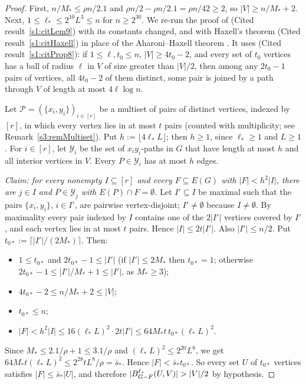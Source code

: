 \begin{proof}
First, $n/M_*\le\rho n/2.1$ and
$\rho n/2-\rho n/2.1=\rho n/42\ge2$, so $|V|\ge n/M_*+2$. Next,
$1\le\ell_*\le2^{10}L^3\le n$ for $n\ge2^{30}$. We re-run the proof of
\cite[Lemma~9]{BM} (Cited result~\ref{s1:citLem9}) with its constants changed,
and with Haxell's theorem (Cited result~\ref{s1:citHaxell}) in place of the
Aharoni--Haxell theorem \cite[Theorem~6]{BM}.
It uses \cite[Proposition~8]{BM} (Cited result~\ref{s1:citProp8}): if
$1\le\ell,t_0\le n$, $|V|\ge4t_0-2$, and every set of $t_0$ vertices has
a ball of radius $\ell$ in $V$ of size greater than $|V|/2$, then among
any $2t_0-1$ pairs of vertices, all $4t_0-2$ of them distinct, some pair
is joined by a path through $V$ of length at most $4\ell\log n$.

Let $\mathcal P=(\{x_i,y_i\})_{i\in[r]}$ be a multiset of pairs of
distinct vertices, indexed by $[r]$, in which every vertex lies in at
most $t$ pairs (counted with multiplicity; see
Remark~\ref{s3:remMultiset}). Put $h:=\lfloor4\ell_*L\rfloor$; then
$h\ge1$, since $\ell_*\ge1$ and $L\ge1$. For $i\in[r]$, let $\mathcal Y_i$
be the set of $x_iy_i$-paths in $G$ that have length at most $h$ and all
interior vertices in $V$. Every $P\in\mathcal Y_i$ has at most $h$ edges.

\emph{Claim: for every nonempty $I\subseteq[r]$ and every $F\subseteq E(G)$
with $|F|<h^2|I|$, there are $j\in I$ and $P\in\mathcal Y_j$ with
$E(P)\cap F=\emptyset$.}
Let $I'\subseteq I$ be maximal such that the pairs $\{x_i,y_i\}$,
$i\in I'$, are pairwise vertex-disjoint; $I'\ne\emptyset$ because
$I\ne\emptyset$. By maximality every pair
indexed by $I$ contains one of the $2|I'|$ vertices covered by $I'$, and
each vertex lies in at most $t$ pairs. Hence $|I|\le2t|I'|$. Also
$|I'|\le n/2$. Put $t_{0*}:=\lceil|I'|/(2M_*)\rceil$. Then:
\begin{itemize}
\item $1\le t_{0*}$ and $2t_{0*}-1\le|I'|$ (if $|I'|\le2M_*$ then
  $t_{0*}=1$; otherwise $2t_{0*}-1\le|I'|/M_*+1\le|I'|$, as $M_*\ge3$);
\item $4t_{0*}-2\le n/M_*+2\le|V|$;
\item $t_{0*}\le n$;
\item $|F|<h^2|I|\le16(\ell_*L)^2\cdot2t|I'|\le64M_*t\,t_{0*}(\ell_*L)^2$.
\end{itemize}
Since $M_*\le2.1/\rho+1\le3.1/\rho$ and $(\ell_*L)^2\le2^{20}L^8$, we get
$64M_*t(\ell_*L)^2\le2^{28}tL^8/\rho=\bar s_*$. Hence $|F|<\bar s_*t_{0*}$.
So every set $U$ of $t_{0*}$ vertices satisfies $|F|\le\bar s_*|U|$, and
therefore $|\Ball{\ell_*}{G-F}{U,V}|>|V|/2$ by hypothesis.


\end{proof}
